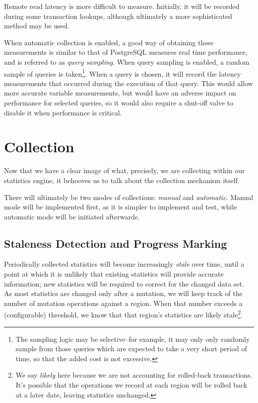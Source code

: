 Remote read latency is more difficult to measure. Initially, it will be recorded during some transaction lookups, although ultimately a more sophisticated method may be used.

When automatic collection is enabled, a good way of obtaining these measurements is similar to that of PostgreSQL\cite{PGCollector} measures real time performance, and is referred to as \emph{query sampling}. When query sampling is enabled, a random sample of queries is taken\footnote{The sampling logic may be selective--for example, it may only only randomly sample from those queries which are expected to take a very short period of time, so that the added cost is not excessive.}. When a query is chosen, it will record the latency measurements that occurred during the execution of that query. This would allow more accurate variable measurements, but would have an adverse impact on performance for selected queries, so it would also require a shut-off valve to disable it when performance is critical.

\section{Collection}
\label{sec:Collection}
Now that we have a clear image of what, precisely, we are collecting within our statistics engine, it behooves us to talk about the collection mechanism itself.

There will ultimately be two modes of collections: \emph{manual} and \emph{automatic}. Manual mode will be implemented first, as it is simpler to implement and test, while automatic mode will be initiated afterwards.

\subsection{Staleness Detection and Progress Marking}
Periodically collected statistics will become increasingly \emph{stale} over time, until a point at which it is unlikely that existing statistics will provide accurate information; new statistics will be required to correct for the changed data set. As most statistics are changed only after a mutation, we will keep track of the number of mutation operations against a region. When that number exceeds a (configurable) threshold, we know that that region's statistics are likely stale\footnote{We say \emph{likely} here because we are not accounting for rolled-back transactions. It's possible that the operations we record at each region will be rolled back at a later date, leaving statistics unchanged.}. 

